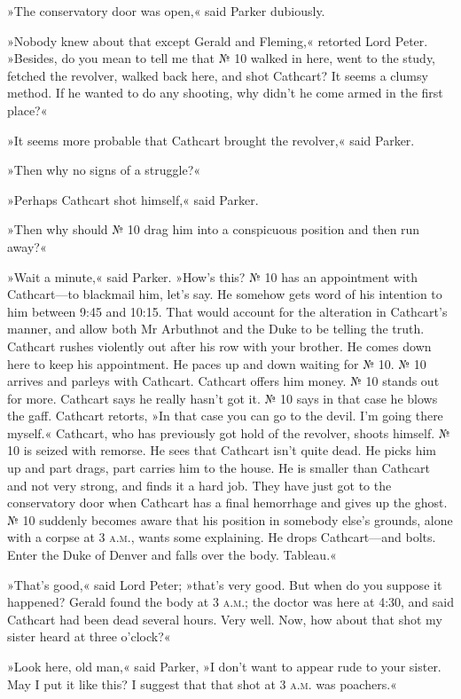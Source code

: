 »The conservatory door was open,« said Parker dubiously.

»Nobody knew about that except Gerald and Fleming,« retorted Lord Peter. »Besides, do you mean to tell me that № 10 walked in here, went to the study, fetched the revolver, walked back here, and shot Cathcart? It seems a clumsy method. If he wanted to do any shooting, why didn't he come armed in the first place?«

»It seems more probable that Cathcart brought the revolver,« said Parker.

»Then why no signs of a struggle?«

»Perhaps Cathcart shot himself,« said Parker.

»Then why should № 10 drag him into a conspicuous position and then run away?«

»Wait a minute,« said Parker. »How's this? № 10 has an appointment with Cathcart\allowbreak---\allowbreak to blackmail him, let's say. He somehow gets word of his intention to him between 9:45 and 10:15. That would account for the alteration in Cathcart's manner, and allow both Mr Arbuthnot and the Duke to be telling the truth. Cathcart rushes violently out after his row with your brother. He comes down here to keep his appointment. He paces up and down waiting for № 10. № 10 arrives and parleys with Cathcart. Cathcart offers him money. № 10 stands out for more. Cathcart says he really hasn't got it. № 10 says in that case he blows the gaff. Cathcart retorts, »In that case you can go to the devil. I'm going there myself.« Cathcart, who has previously got hold of the revolver, shoots himself. № 10 is seized with remorse. He sees that Cathcart isn't quite dead. He picks him up and part drags, part carries him to the house. He is smaller than Cathcart and not very strong, and finds it a hard job. They have just got to the conservatory door when Cathcart has a final hemorrhage and gives up the ghost. № 10 suddenly becomes aware that his position in somebody else's grounds, alone with a corpse at 3 \textsc{a.m.}, wants some explaining. He drops Cathcart\allowbreak---\allowbreak and bolts. Enter the Duke of Denver and falls over the body. Tableau.«

»That's good,« said Lord Peter; »that's very good. But when do you suppose it happened? Gerald found the body at 3 \textsc{a.m.}; the doctor was here at 4:30, and said Cathcart had been dead several hours. Very well. Now, how about that shot my sister heard at three o'clock?«

»Look here, old man,« said Parker, »I don't want to appear rude to your sister. May I put it like this? I suggest that that shot at 3 \textsc{a.m.} was poachers.«


